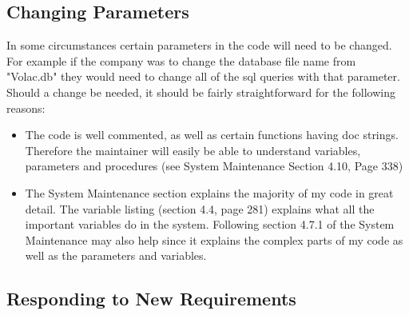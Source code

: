 \subsection{Changing Parameters}

In some circumstances certain parameters in the code will need to be changed. For example if the company was to change the database file name from "Volac.db" they would need to change all of the sql queries with that parameter. Should a change be needed, it should be fairly straightforward for the following reasons:
\begin{itemize}
\item{The code is well commented, as well as certain functions having doc strings. Therefore the maintainer will easily be able to understand variables, parameters and procedures (see System Maintenance Section 4.10, Page 338)}
\item{The System Maintenance section explains the majority of my code in great detail. The variable listing (section 4.4, page 281) explains what all the important variables do in the system. Following section 4.7.1 of the System Maintenance may also help since it explains the complex parts of my code as well as the parameters and variables.}
\end{itemize}

\subsection{Responding to New Requirements}

